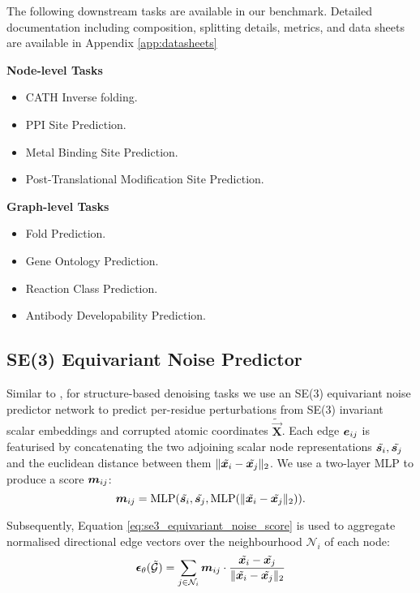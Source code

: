 
The following downstream tasks are available in our benchmark.
Detailed documentation including composition, splitting details, metrics, and data sheets \citep{gebru2021datasheets} are available in Appendix \ref{app:datasheets}

\textbf{Node-level Tasks}
\begin{itemize}
\item CATH Inverse folding.
\item PPI Site Prediction. 
\item Metal Binding Site Prediction. 
\item Post-Translational Modification Site Prediction. 
\end{itemize}

\textbf{Graph-level Tasks}
\begin{itemize}
\item Fold Prediction. 
\item Gene Ontology Prediction. 
\item Reaction Class Prediction. 
\item Antibody Developability Prediction. 
\end{itemize}

\subsection{SE(3) Equivariant Noise Predictor}\label{sec:eq-noise-predictor}
Similar to \citet{zhang2023physicsinspired}, for structure-based denoising tasks we use an SE(3) equivariant noise predictor network to predict per-residue perturbations from SE(3) invariant scalar embeddings and corrupted atomic coordinates $\tilde{\bm{\vec{X}}}$. Each edge ${\bm{e}}_{ij}$ is featurised by concatenating the two adjoining scalar node representations $\tilde{{\bm{s}}_{i}}, \tilde{{\bm{s}}_{j}}$ and the euclidean distance between them $\| \tilde{{\bm{x}}_{i}} - \tilde{{\bm{x}}_{j}} \|_2$. We use a two-layer MLP to produce a score ${\bm{m}}_{ij}$:
\begin{equation}
    \label{eq:se3_equivariant_noise_score}
    {\bm{m}}_{ij} = \mathrm{MLP}(\tilde{{\bm{s}}_{i}}, \tilde{{\bm{s}}_{j}}, \mathrm{MLP}(\| \tilde{{\bm{x}}_{i}} - \tilde{{\bm{x}}_{j}} \|_2)).
\end{equation}

Subsequently, Equation \ref{eq:se3_equivariant_noise_score} is used to aggregate normalised directional edge vectors over the neighbourhood $\mathcal{N}_i$ of each node:
\begin{equation}
    \bm{\epsilon}_\theta(\tilde{\mathcal{G}}) = \sum_{j \in \mathcal{N}_i} {\bm{m}}_{ij} \cdot \frac{\tilde{{\bm{x}}_{i}} - \tilde{{\bm{x}}_{j}}}{\| \tilde{{\bm{x}}_{i}} - \tilde{{\bm{x}}_{j}} \|_2}
\end{equation}

